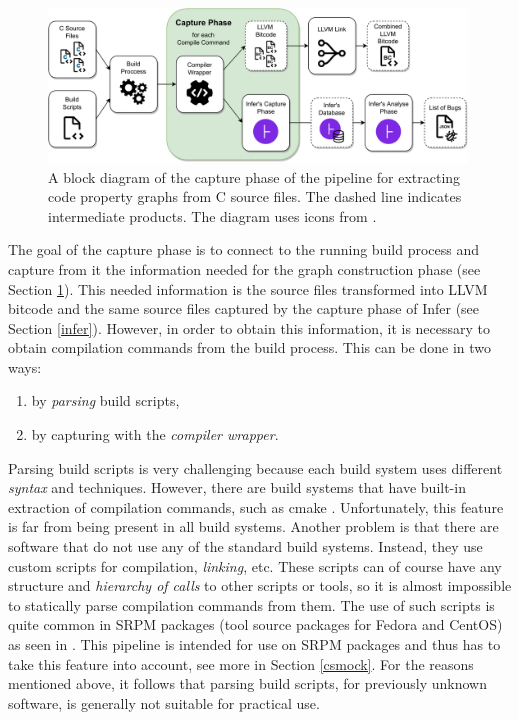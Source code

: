 \begin{figure}[hbt]
	\centering
	\includegraphics[width=0.99\textwidth]{figures/capture.drawio.pdf}
	\caption{A block diagram of the capture phase of the pipeline for extracting code property graphs from C source files. The dashed line indicates intermediate products. The diagram uses icons from \cite{infer-web, icon-compiler}.}
	\label{figure:pipeline-capture}
\end{figure}

The goal of the capture phase is to connect to the running build process and capture from it the information needed for the graph construction phase (see Section  \ref{figure:pipeline-capture}). This needed information is the source files transformed into LLVM bitcode and the same source files captured by the capture phase of Infer (see Section \ref{infer}). However, in order to obtain this information, it is necessary to obtain compilation commands from the build process. This can be done in two ways:

\begin{enumerate}
    \item by \textit{parsing} build scripts,
    \item by capturing with the \textit{compiler wrapper}.
\end{enumerate}

Parsing build scripts is very challenging because each build system uses different \textit{syntax} and techniques. However, there are build systems that have built-in extraction of compilation commands, such as cmake \cite{cmake-doc}. Unfortunately, this feature is far from being present in all build systems. Another problem is that there are software that do not use any of the standard build systems. Instead, they use custom scripts for compilation, \textit{linking}, etc. These scripts can of course have any structure and \textit{hierarchy of calls} to other scripts or tools, so it is almost impossible to statically parse compilation commands from them. The use of such scripts is quite common in SRPM packages (tool source packages for Fedora and CentOS) as seen in \cite{bc}. This pipeline is intended for use on SRPM packages and thus has to take this feature into account, see more in Section \ref{csmock}. For the reasons mentioned above, it follows that parsing build scripts, for previously unknown software, is generally not suitable for practical use.

